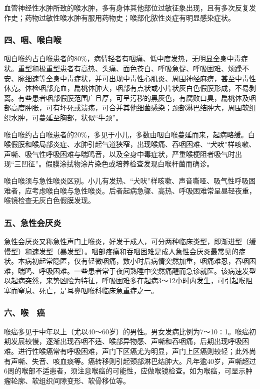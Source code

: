 血管神经性水肿所致的喉水肿，多有身体其他部位过敏征象出现，且有多次反复发作史；药物过敏性喉水肿有服用药物史；喉部化脓性炎症有明显感染症状。

\subsubsection{四、咽、喉白喉}

咽白喉约占白喉患者的80\%，病情轻者有咽痛、低中度发热，无明显全身中毒症状。重型和极重型患者有高热、头痛、面色苍白、呼吸急促、呼吸困难、烦躁不安、脉细速等全身中毒症状，并可出现中毒性心肌炎、周围神经麻痹，甚至中毒性休克。体检咽部充血，扁桃体肿大，咽部有点状或小片状灰白色假膜形成，不易剥离。有些患者咽部假膜范围广且厚，可呈污秽的黑灰色，有腐败口臭，扁桃体及咽部高度肿胀，可有坏死或溃疡，可合并其他细菌感染；颈部淋巴结肿大，周围软组织水肿，可蔓延至胸部，状似“牛颈”。

喉白喉约占白喉患者的20\%，多见于小儿，多数由咽白喉蔓延而来，起病略缓。白喉假膜和喉局部炎症、水肿引起气道狭窄，出现喉痛、吞咽困难、“犬吠”样咳嗽、声嘶、吸气性呼吸困难与喘鸣音，以及全身中毒症状，严重喉梗阻者吸气时出现“三凹征”。假膜涂拭物涂片染色或培养检查发现白喉杆菌而确诊。

喉白喉须与急性喉炎区别。小儿有发热、“犬吠”样咳嗽、声音嘶哑、吸气性呼吸困难者，应考虑喉白喉与急性喉炎。后者起病急骤、高热、呼吸困难常呈昼轻夜重，喉镜检查无灰白色假膜发现。

\subsubsection{五、急性会厌炎}

急性会厌炎又称急性声门上喉炎，好发于成人，可分两种临床类型，即渐进型（缓慢型）和速发型（暴发型）。咽部疼痛和吞咽困难是成人急性会厌炎最常见的症状。本病初起常隐匿，仅有轻微咽痛，数小时后病情突然加重，咽痛难忍，吞咽困难，喘鸣、呼吸困难。一些患者常于夜间熟睡中突然痛醒而急诊就医。该病速发型以起病突然，来势凶险为特征，呼吸困难多在起病3～12小时内发生，可引起喉阻塞而窒息、死亡，是耳鼻咽喉科临床急重症之一。

\subsubsection{六、喉　癌}

喉癌多见于中年以上（尤以40～60岁）的男性。男女发病比例为7～10∶1。喉癌初期发展较慢，逐渐出现吞咽不适、喉部异物感、声嘶和吞咽痛，后期出现呼吸困难。进行性喉癌常有呼吸困难，声门下区癌尤为明显，声门上区癌则较轻；此外尚有声嘶、失音、咳血痰等。癌转移则引起颈部淋巴结肿大。凡年逾40岁，声嘶超过6周的喉部不适患者，须注意喉癌的可能性，应做喉镜检查。如为喉癌，可显示肿瘤轮廓、软组织间隙变形、软骨移位等。


